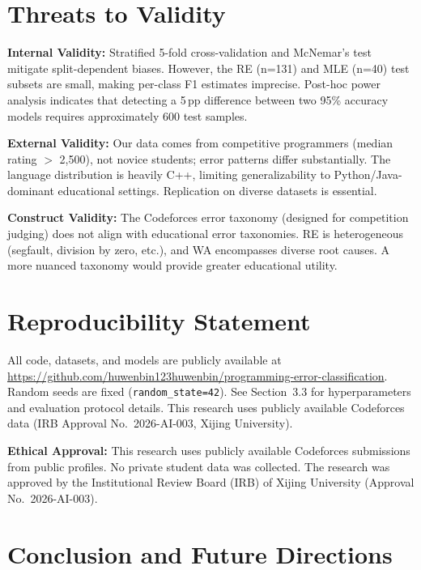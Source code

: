 \documentclass[10pt,a4paper]{article}
\begin{document}
\section{Threats to Validity}

\textbf{Internal Validity:} Stratified 5-fold cross-validation and McNemar's
test mitigate split-dependent biases. However, the RE (n=131) and MLE (n=40)
test subsets are small, making per-class F1 estimates imprecise. Post-hoc
power analysis indicates that detecting a 5\,pp difference between two 95\%
accuracy models requires approximately 600 test samples.

\textbf{External Validity:} Our data comes from competitive programmers
(median rating $>$ 2,500), not novice students; error patterns differ
substantially. The language distribution is heavily C++, limiting
generalizability to Python/Java-dominant educational settings. Replication on
diverse datasets is essential.

\textbf{Construct Validity:} The Codeforces error taxonomy (designed for
competition judging) does not align with educational error taxonomies. RE is
heterogeneous (segfault, division by zero, etc.), and WA encompasses diverse
root causes. A more nuanced taxonomy would provide greater educational
utility.

\section*{Reproducibility Statement}

\begin{sloppypar}\raggedright
All code, datasets, and models are publicly available at
\url{https://github.com/huwenbin123huwenbin/programming-error-classification}. Random
seeds are fixed (\texttt{random\_state=42}). See Section~3.3 for
hyperparameters and evaluation protocol details. This research uses publicly
available Codeforces data (IRB Approval No.~2026-AI-003, Xijing University).
\end{sloppypar}

\textbf{Ethical Approval:} This research uses publicly available Codeforces
submissions from public profiles. No private student data was collected.
The research was approved by the Institutional Review Board (IRB) of
Xijing University (Approval No.~2026-AI-003).

\section{Conclusion and Future Directions}
\end{document}
